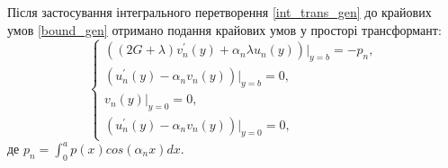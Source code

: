 Після застосування інтегрального перетворення \eqref{int_trans_gen} до крайових умов \eqref{bound_gen}
отримано подання крайових умов у просторі трансформант:
\begin{equation}\label{transf_bound_gen}
    \begin{cases}
        \left( (2G + \lambda)v_n^{'}(y) + \alpha_n \lambda u_n(y) \right)|_{y=b} = -p_n, \\
        \left(u_n^{'}(y) - \alpha_n v_n(y)  \right)|_{y=b} = 0, \\
        v_n(y)|_{y=0} = 0, \\
        \left(u_n^{'}(y) - \alpha_n v_n(y)  \right)|_{y=0} = 0,
    \end{cases}
\end{equation}
де $p_n = \int_{0}^{a} p(x) cos(\alpha_n x) dx$.

